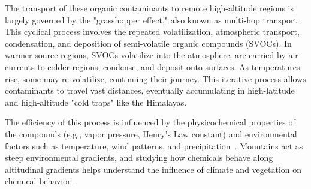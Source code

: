 \documentclass[11pt]{article}
\begin{document}
\begin{doublespace}
    The transport of these organic contaminants to remote high-altitude regions is largely governed by the "grasshopper effect," also known as multi-hop transport. 
    This cyclical process involves the repeated volatilization, atmospheric transport, condensation, and deposition of semi-volatile organic compounds (SVOCs).
    In warmer source regions, SVOCs volatilize into the atmosphere, are carried by air currents to colder regions, condense, and deposit onto surfaces.
    As temperatures rise, some may re-volatilize, continuing their journey. This iterative process allows contaminants to travel vast distances, eventually accumulating in high-latitude and high-altitude "cold traps" like the Himalayas.

    The efficiency of this process is influenced by the physicochemical properties of the compounds (e.g., vapor pressure, Henry's Law constant) and environmental factors such as temperature, wind patterns, and precipitation~\cite{Wenkai}.
    Mountains act as steep environmental gradients, and studying how chemicals behave along altitudinal gradients helps understand the influence of climate and vegetation on chemical behavior~\cite{Daly2005}.


\end{doublespace}
\end{document}
